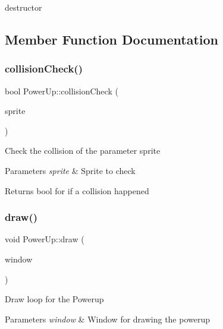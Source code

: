 destructor 



\subsection{Member Function Documentation}
\mbox{\label{class_power_up_ab180aaeba2853c15b12df7f0a84f9801}} 
\subsubsection{\texorpdfstring{collisionCheck()}{collisionCheck()}}
{\footnotesize\ttfamily bool Power\+Up\+::collision\+Check (\begin{DoxyParamCaption}\item[{sf\+::\+Sprite}]{sprite }\end{DoxyParamCaption})}



Check the collision of the parameter sprite 


\begin{DoxyParams}{Parameters}
{\em sprite} & Sprite to check\\
\hline
\end{DoxyParams}
\begin{DoxyReturn}{Returns}
bool for if a collision happened
\end{DoxyReturn}
\mbox{\label{class_power_up_a79c505ad6dbc8aedeadb7e77a2302503}} 
\subsubsection{\texorpdfstring{draw()}{draw()}}
{\footnotesize\ttfamily void Power\+Up\+::draw (\begin{DoxyParamCaption}\item[{sf\+::\+Render\+Window \&}]{window }\end{DoxyParamCaption})}



Draw loop for the Powerup 


\begin{DoxyParams}{Parameters}
{\em window} & Window for drawing the powerup\\
\hline
\end{DoxyParams}
\mbox{\label{class_power_up_aa59543dd76b1d7e2bd7caccb9c7e954d}} 

